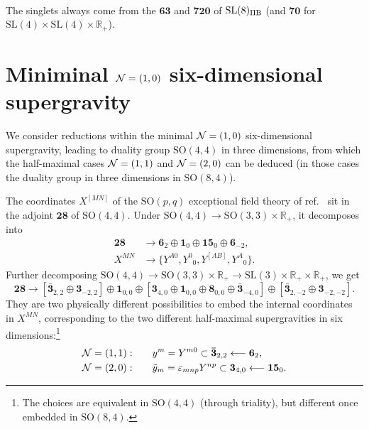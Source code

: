 \documentclass[11pt]{article}
\newcommand{\SO}{\ensuremath{\mathrm{SO}}\xspace}
\newcommand{\SL}{\ensuremath{\mathrm{SL}}\xspace}
\newcommand{\R}{\ensuremath{\mathbb{R}}\xspace}
\begin{document}
\paragraph*{} The singlets always come from the $\bm{63}$ and $\bm{720}$ of $\SL(8)_{\rm IIB}$ (and $\bm{70}$ for $\SL(4)\times\SL(4)\times\R_{+}$).

\appendix

\section{Miniminal ${\cal N}=(1,0)$ six-dimensional supergravity}
We consider reductions within the minimal ${\cal N}=(1,0)$ six-dimensional supergravity, leading to duality group $\SO(4,4)$ in three dimensions, from which the half-maximal cases ${\cal N}=(1,1)$ and ${\cal N}=(2,0)$ can be deduced (in those cases the duality group in three dimensions in $\SO(8,4)$).

The coordinates $X^{[MN]}$ of the $\SO(p,q)$ exceptional field theory of ref.~\cite{Hohm:2017wtr} sit in the adjoint $\bm{28}$ of $\SO(4,4)$. Under $\SO(4,4)\rightarrow\SO(3,3)\times\R_{+}$, it decomposes into
\begin{equation}  
  \begin{aligned}
    \bm{28} &\longrightarrow \bm{6}_{2} \oplus \bm{1}_{0} \oplus \bm{15}_{0} \oplus \bm{6}_{-2},\\
    X^{MN} &\longrightarrow \{Y^{A0},Y^{0}{}_{0},Y^{[AB]},Y^{A}{}_{0}\}.
  \end{aligned}
\end{equation}
Further decomposing $\SO(4,4)\rightarrow\SO(3,3)\times\R_{+}\rightarrow\SL(3)\times\R_{+}\times\R_{+}$, we get
\begin{equation}  \label{eq:decomp28SO8}
  \bm{28} \longrightarrow \left[\bm{\bar{3}}_{2,2} \oplus \bm{3}_{-2,2}\right] \oplus \bm{1}_{0,0} \oplus \left[\bm{3}_{4,0} \oplus \bm{1}_{0,0} \oplus \bm{8}_{0,0} \oplus \bm{\bar{3}}_{-4,0}\right] \oplus \left[\bm{\bar{3}}_{2,-2} \oplus \bm{3}_{-2,-2}\right].
\end{equation}
They are two physically different possibilities to embed the internal coordinates in $X^{MN}$, corresponding to the two different half-maximal supergravities in six dimensions:\footnote{The choices are equivalent in $\SO(4,4)$ (through triality), but different once embedded in $\SO(8,4)$.}
\begin{equation}  \label{eq:coordSO8}
  \begin{aligned}
    {\cal N}=(1,1):&\qquad y^{m}=Y^{m0}\subset\bm{\bar{3}}_{2,2} \longleftarrow \bm{6}_{2},\\
    {\cal N}=(2,0):&\qquad \tilde{y}_{m}=\varepsilon_{mnp}Y^{np}\subset\bm{3}_{4,0}\longleftarrow\bm{15}_{0}.
  \end{aligned}
\end{equation}
\end{document}
